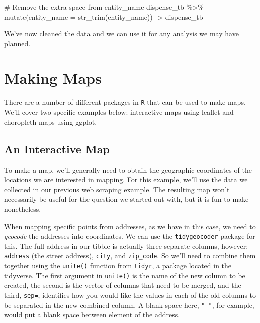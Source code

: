\documentclass[
  letterpaper,
]{book}
\newenvironment{Shaded}{\begin{snugshade}}{\end{snugshade}}
\newcommand{\AttributeTok}[1]{\textcolor[rgb]{0.40,0.45,0.13}{#1}}
\newcommand{\CommentTok}[1]{\textcolor[rgb]{0.37,0.37,0.37}{#1}}
\newcommand{\FunctionTok}[1]{\textcolor[rgb]{0.28,0.35,0.67}{#1}}
\newcommand{\NormalTok}[1]{\textcolor[rgb]{0.00,0.23,0.31}{#1}}
\newcommand{\OtherTok}[1]{\textcolor[rgb]{0.00,0.23,0.31}{#1}}
\newcommand{\SpecialCharTok}[1]{\textcolor[rgb]{0.37,0.37,0.37}{#1}}
\begin{document}
\begin{Shaded}
\begin{Highlighting}[]
\CommentTok{\# Remove the extra space from entity\_name}
\NormalTok{dispense\_tb }\SpecialCharTok{\%\textgreater{}\%} 
  \FunctionTok{mutate}\NormalTok{(}\AttributeTok{entity\_name =} \FunctionTok{str\_trim}\NormalTok{(entity\_name)) }\OtherTok{{-}\textgreater{}}\NormalTok{ dispense\_tb}
\end{Highlighting}
\end{Shaded}

We've now cleaned the data and we can use it for any analysis we may
have planned.

\hypertarget{making-maps}{%
\section{Making Maps}\label{making-maps}}

There are a number of different packages in \texttt{R} that can be used
to make maps. We'll cover two specific examples below: interactive maps
using leaflet and choropleth maps using ggplot.

\hypertarget{an-interactive-map}{%
\subsection{An Interactive Map}\label{an-interactive-map}}

To make a map, we'll generally need to obtain the geographic coordinates
of the locations we are interested in mapping. For this example, we'll
use the data we collected in our previous web scraping example. The
resulting map won't necessarily be useful for the question we started
out with, but it is fun to make nonetheless.

When mapping specific points from addresses, as we have in this case, we
need to \emph{geocode} the addresses into coordinates. We can use the
\texttt{tidygeocoder} package for this. The full address in our tibble
is actually three separate columns, however: \texttt{address} (the
street address), \texttt{city}, and \texttt{zip\_code}. So we'll need to
combine them together using the \texttt{unite()} function from
\texttt{tidyr}, a package located in the tidyverse. The first argument
in \texttt{unite()} is the name of the new column to be created, the
second is the vector of columns that need to be merged, and the third,
\texttt{sep=}, identifies how you would like the values in each of the
old columns to be separated in the new combined column. A blank space
here, \texttt{"\ "}, for example, would put a blank space between
element of the address.
\end{document}
